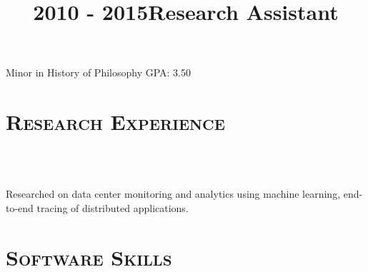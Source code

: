\begin{resume}
  \title{2010 - 2015}
  \begin{position}
    Minor in History of Philosophy \hfill GPA: 3.50 \hspace{-2.5mm}
  \end{position}



  \section{\textsc{Research Experience}}

  \begin{formatb}
    \\
    \body\\
  \end{formatb}

  \title{Research Assistant}
  \begin{position}
    Researched on data center monitoring and analytics using machine learning,
    end-to-end tracing of distributed applications.
  \end{position}


  \section{\textsc{Software Skills}}


\end{resume}
